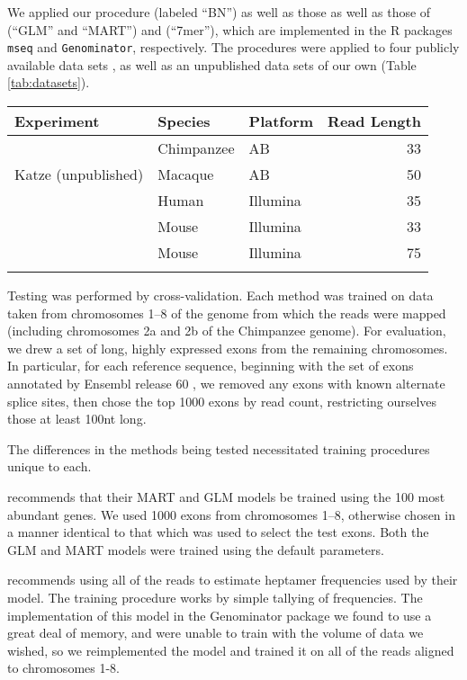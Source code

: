 \documentclass{bioinfo}
\begin{document}
We applied our procedure (labeled ``BN'') as well as those as well as those of
\citet{Li2010} (``GLM'' and ``MART'') and \citet{Hansen2010} (``7mer''), which
are implemented in the R packages \texttt{mseq} and \texttt{Genominator},
respectively. The procedures were applied to four publicly available data
sets \citep{Bullard2010, Mortazavi2008, Trapnell2010, Wetterbom2010}, as well as
an unpublished data sets of our own (Table \ref{tab:datasets}).

\begin{table}
{
\begin{tabular}{lllr}\toprule
Experiment & Species & Platform & Read Length \\\midrule
\citet{Wetterbom2010} & Chimpanzee & AB & 33 \\
Katze (unpublished) & Macaque & AB & 50 \\
\citet{Bullard2010} & Human & Illumina & 35 \\
\citet{Mortazavi2008} & Mouse & Illumina & 33 \\
\citet{Trapnell2010} & Mouse & Illumina & 75 \\\botrule
\end{tabular}
}{}
\end{table}


Testing was performed by cross-validation. Each method was trained on data taken
from chromosomes 1--8 of the genome from which the reads were mapped (including
chromosomes 2a and 2b of the Chimpanzee genome). For evaluation, we drew a set
of long, highly expressed exons from the remaining chromosomes. In particular, for
each reference sequence, beginning with the set of exons annotated by Ensembl
release 60 \cite{Hubbard2009}, we removed any exons with known alternate splice
sites, then chose the top 1000 exons by read count, restricting ourselves those
at least 100nt long.

The differences in the methods being tested necessitated training procedures
unique to each.

\citet{Li2010} recommends that their MART and GLM models be trained using the
100 most abundant genes. We used 1000 exons from chromosomes 1--8, otherwise
chosen in a manner identical to that which was used to select the test exons.
Both the GLM and MART models were trained using the default parameters.

\citet{Hansen2010} recommends using all of the reads to estimate heptamer
frequencies used by their model. The training procedure works by simple tallying
of frequencies. The implementation of this model in the Genominator package we
found to use a great deal of memory, and were unable to train with the volume of
data we wished, so we reimplemented the model and trained it on all of the reads
aligned to chromosomes 1-8.
\end{document}
